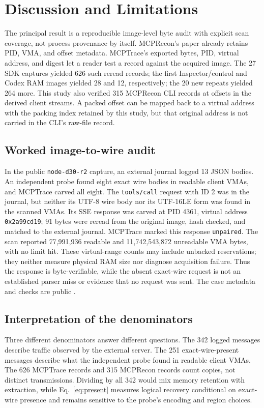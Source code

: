 \documentclass[conference,10pt]{IEEEtran}
\begin{document}
\section{Discussion and Limitations}
The principal result is a reproducible image-level byte audit with explicit scan coverage, not process provenance by itself. MCPRecon's paper already retains PID, VMA, and offset metadata. MCPTrace's exported bytes, PID, virtual address, and digest let a reader test a record against the acquired image. The 27 SDK captures yielded 626 such reread records; the first Inspector/control and Codex RAM images yielded 28 and 12, respectively; the 20 new repeats yielded 264 more. This study also verified 315 MCPRecon CLI records at offsets in the derived client streams. A packed offset can be mapped back to a virtual address with the packing index retained by this study, but that original address is not carried in the CLI's raw-file record.

\subsection{Worked image-to-wire audit}
In the public \texttt{node-d30-r2} capture, an external journal logged 13 JSON bodies. An independent probe found eight exact wire bodies in readable client VMAs, and MCPTrace carved all eight. The \texttt{tools/call} request with ID 2 was in the journal, but neither its UTF-8 wire body nor its UTF-16LE form was found in the scanned VMAs. Its SSE response was carved at PID 4361, virtual address \texttt{0x2a99cd19}; 91 bytes were reread from the original image, hash checked, and matched to the external journal. MCPTrace marked this response \texttt{unpaired}. The scan reported 77,991,936 readable and 11,742,543,872 unreadable VMA bytes, with no limit hit. These virtual-range counts may include unbacked reservations; they neither measure physical RAM size nor diagnose acquisition failure. Thus the response is byte-verifiable, while the absent exact-wire request is not an established parser miss or evidence that no request was sent. The case metadata and checks are public \cite{mcptrace-case}.

\subsection{Interpretation of the denominators}
Three different denominators answer different questions. The 342 logged messages describe traffic observed by the external server. The 251 exact-wire-present messages describe what the independent probe found in readable client VMAs. The 626 MCPTrace records and 315 MCPRecon records count copies, not distinct transmissions. Dividing by all 342 would mix memory retention with extraction, while Eq.~\ref{eq:present} measures logical recovery conditional on exact-wire presence and remains sensitive to the probe's encoding and region choices.
\end{document}
